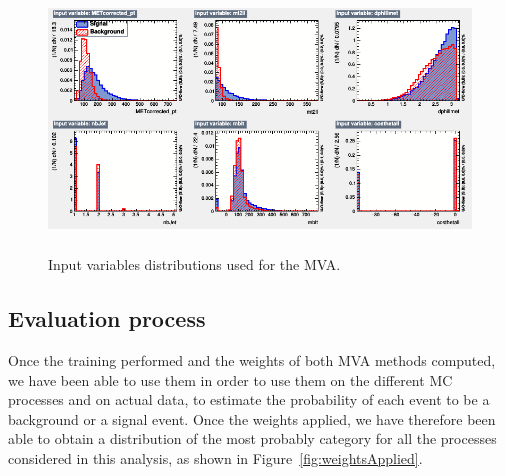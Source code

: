 \documentclass[a4paper, 10pt, openright]{report}
\begin{document}
\begin{figure}[htbp]
\centering
\includegraphics[width=12cm, height=7cm]{figs/MVA_input.png}
\caption{Input variables distributions used for the \ac{MVA}.}
\label{fig:inputVar}
\end{figure}

\subsection{Evaluation process}

Once the training performed and the weights of both \ac{MVA} methods computed, we have been able to use them in order to use them on the different \ac{MC} processes and on actual data, to estimate the probability of each event to be a background or a signal event. Once the weights applied, we have therefore been able to obtain a distribution of the most probably category for all the processes considered in this analysis, as shown in Figure~\ref{fig:weightsApplied}.
\end{document}
